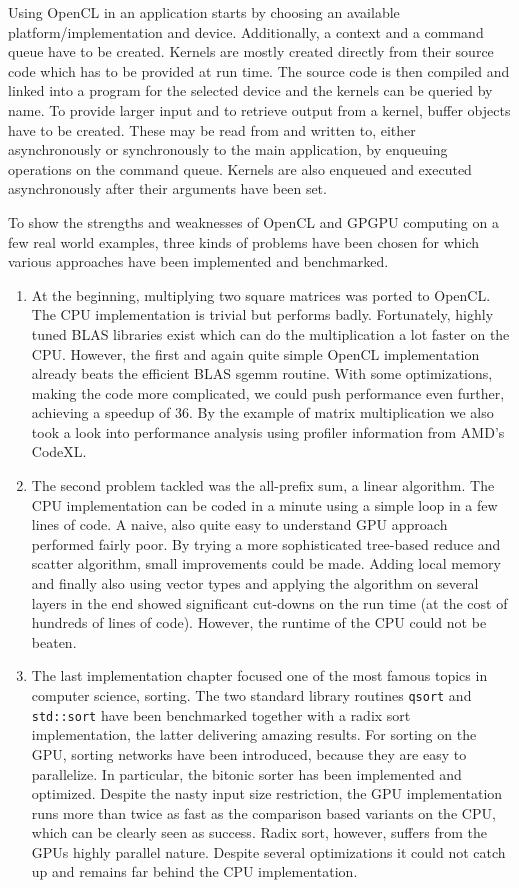 Using OpenCL in an application starts by choosing an available platform/implementation and device. Additionally, a context and a command queue have to be created. Kernels are mostly created directly from their source code which has to be provided at run time. The source code is then compiled and linked into a program for the selected device and the kernels can be queried by name. To provide larger input and to retrieve output from a kernel, buffer objects have to be created. These may be read from and written to, either asynchronously or synchronously to the main application, by enqueuing operations on the command queue. Kernels are also enqueued and executed asynchronously after their arguments have been set.

To show the strengths and weaknesses of OpenCL and GPGPU computing on a few real world examples, three kinds of problems have been chosen for which various approaches have been implemented and benchmarked.

\begin{enumerate}
	\item
	At the beginning, multiplying two square matrices was ported to OpenCL. The CPU implementation is trivial but performs badly. Fortunately, highly tuned BLAS libraries exist which can do the multiplication a lot faster on the CPU. However, the first and again quite simple OpenCL implementation already beats the efficient BLAS sgemm routine. With some optimizations, making the code more complicated, we could push performance even further, achieving a speedup of 36.
	By the example of matrix multiplication we also took a look into performance analysis using profiler information from AMD's CodeXL.
	
	\item
	The second problem tackled was the all-prefix sum, a linear algorithm. The CPU implementation can be coded in a minute using a simple loop in a few lines of code. A naive, also quite easy to understand GPU approach performed fairly poor. By trying a more sophisticated tree-based reduce and scatter algorithm, small improvements could be made. Adding local memory and finally also using vector types and applying the algorithm on several layers in the end showed significant cut-downs on the run time (at the cost of hundreds of lines of code). However, the runtime of the CPU could not be beaten.
	
	\item
	The last implementation chapter focused one of the most famous topics in computer science, sorting. The two standard library routines \lstinline!qsort! and \lstinline!std::sort! have been benchmarked together with a radix sort implementation, the latter delivering amazing results. For sorting on the GPU, sorting networks have been introduced, because they are easy to parallelize. In particular, the bitonic sorter has been implemented and optimized. Despite the nasty input size restriction, the GPU implementation runs more than twice as fast as the comparison based variants on the CPU, which can be clearly seen as success. Radix sort, however, suffers from the GPUs highly parallel nature. Despite several optimizations it could not catch up and remains far behind the CPU implementation.
\end{enumerate}


